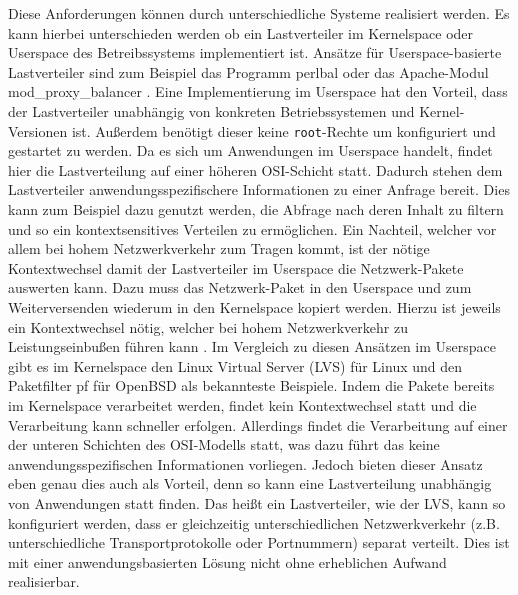 \documentclass[a4paper, 12pt, BCOR10mm, DIV12, toc=bibliography, toc=listof, german]{scrbook}
\begin{document}
			Diese Anforderungen können durch unterschiedliche Systeme realisiert werden. Es kann hierbei
			unterschieden werden ob ein Lastverteiler im Kernelspace oder Userspace des Betreibssystems
			implementiert ist. Ansätze für Userspace-basierte Lastverteiler sind zum Beispiel das Programm
			perlbal \cite{perlbal} oder das Apache-Modul mod\_proxy\_balancer \cite{modproxy}.  Eine
			Implementierung im Userspace hat den Vorteil, dass der Lastverteiler unabhängig von konkreten
			Betriebssystemen und Kernel-Versionen ist. Außerdem benötigt dieser keine \texttt{root}-Rechte
			um konfiguriert und gestartet zu werden. Da es sich um Anwendungen im Userspace handelt,
			findet hier die Lastverteilung auf einer höheren OSI-Schicht \cite{tanenbaum1988} statt.
			Dadurch stehen dem Lastverteiler anwendungsspezifischere Informationen zu einer Anfrage
			bereit. Dies kann zum Beispiel dazu genutzt werden, die Abfrage nach deren Inhalt zu filtern
			und so ein kontextsensitives Verteilen zu ermöglichen.  Ein Nachteil, welcher vor allem bei
			hohem Netzwerkverkehr zum Tragen kommt, ist der nötige Kontextwechsel damit der Lastverteiler
			im Userspace die Netzwerk-Pakete auswerten kann. Dazu muss das Netzwerk-Paket in den Userspace
			und zum Weiterversenden wiederum in den Kernelspace kopiert werden. Hierzu ist jeweils ein
			Kontextwechsel nötig, welcher bei hohem Netzwerkverkehr zu Leistungseinbußen führen kann
			\cite{boehme2006}.  Im Vergleich zu diesen Ansätzen im Userspace gibt es im Kernelspace den
			Linux Virtual Server (LVS) \cite{lvs,zhang2000} für Linux und den Paketfilter
			pf \cite{pf} für OpenBSD als bekannteste Beispiele.
			Indem die Pakete bereits im Kernelspace verarbeitet werden, findet kein Kontextwechsel statt
			und die Verarbeitung kann schneller erfolgen. Allerdings findet die Verarbeitung auf einer der
			unteren Schichten des OSI-Modells statt, was dazu führt das keine anwendungsspezifischen
			Informationen vorliegen. Jedoch bieten dieser Ansatz eben genau dies auch als Vorteil, denn so
			kann eine Lastverteilung unabhängig von Anwendungen statt finden.  Das heißt ein
			Lastverteiler, wie der LVS, kann so konfiguriert werden, dass er gleichzeitig
			unterschiedlichen Netzwerkverkehr (z.B. unterschiedliche Transportprotokolle oder Portnummern)
			separat verteilt. Dies ist mit einer anwendungsbasierten Lösung nicht ohne erheblichen Aufwand
			realisierbar.
\end{document}
